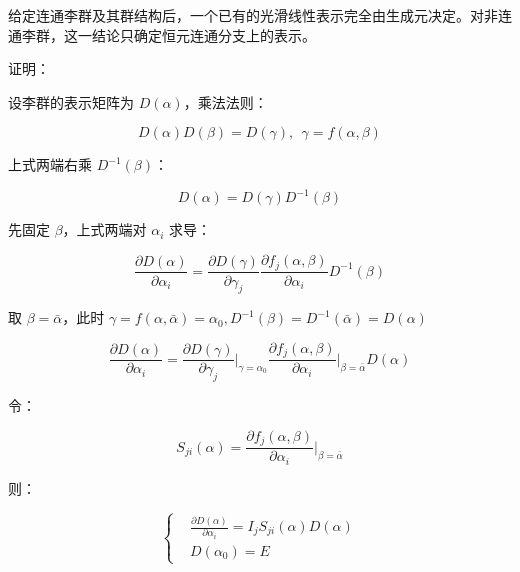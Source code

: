给定连通李群及其群结构后，一个已有的光滑线性表示完全由生成元决定。对非连通李群，这一结论只确定恒元连通分支上的表示。

证明：

设李群的表示矩阵为 $D\left(\alpha\right)$，乘法法则：

\begin{equation}
D\left(\alpha\right)D\left(\beta\right) = D\left(\gamma\right),~~\gamma = f\left(\alpha,\beta\right)
\end{equation}

上式两端右乘 $D^{-1}\left(\beta\right)$：

\begin{equation}
D\left(\alpha\right) = D\left(\gamma\right)D^{-1}\left(\beta\right)
\end{equation}

先固定 $\beta$，上式两端对 $\alpha_i$ 求导：

\begin{equation}
\frac{\partial D\left(\alpha\right) }{\partial \alpha_i }
=\frac{\partial D\left(\gamma\right) }{\partial \gamma_j } \frac{\partial f_j\left(\alpha,\beta\right) }{\partial \alpha_i } D^{-1}\left(\beta\right)
\end{equation}

取 $\beta=\bar{\alpha}$，此时 $\gamma = f\left(\alpha,\bar{\alpha}\right) = \alpha_0,D^{-1}\left(\beta\right) = D^{-1}\left(\bar{\alpha}\right) = D\left(\alpha\right)$

\begin{equation}
\frac{\partial D\left(\alpha\right) }{\partial \alpha_i }
=\frac{\partial D\left(\gamma\right) }{\partial \gamma_j }\bigg|_{\gamma=\alpha_0} \frac{\partial f_j\left(\alpha,\beta\right) }{\partial \alpha_i }\bigg|_{\beta=\bar{\alpha}} D\left(\alpha\right)
\end{equation}

令：

\begin{equation}
S_{ji}\left(\alpha\right)
=\frac{\partial f_j\left(\alpha,\beta\right) }{\partial \alpha_i }\bigg|_{\beta=\bar{\alpha}}
\end{equation}

则：

\begin{equation}
\left\{
\begin{aligned}
&\frac{\partial D\left(\alpha\right) }{\partial \alpha_i } = I_j S_{ji}\left(\alpha\right) D\left(\alpha \right) \\
&D\left(\alpha_0\right) = E
\end{aligned}
\right.
\end{equation}

